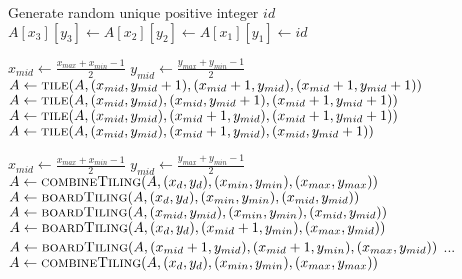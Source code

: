 \documentclass{article}
\begin{document}
\begin{algorithmic}[1]
\State Generate random unique positive integer $id$
\State $A[x_3][y_3] \gets A[x_2][y_2] \gets A[x_1][y_1] \gets id$
\State {}
\EndProcedure

\State $x_{mid} \gets \frac{x_{max} + x_{min} - 1}{2}$
\State $y_{mid} \gets \frac{y_{max} + y_{min} - 1}{2}$
\State $A \gets \Call{tile}{A, (x_{mid}, y_{mid} + 1), (x_{mid} + 1, y_{mid}), (x_{mid} + 1, y_{mid} + 1)}$
\State $A \gets \Call{tile}{A, (x_{mid}, y_{mid}), (x_{mid}, y_{mid} + 1), (x_{mid} + 1, y_{mid} + 1)}$
\State $A \gets \Call{tile}{A, (x_{mid}, y_{mid}), (x_{mid} + 1, y_{mid}), (x_{mid} + 1, y_{mid} + 1)}$
\Else
\State $A \gets \Call{tile}{A, (x_{mid}, y_{mid}), (x_{mid} + 1, y_{mid}), (x_{mid}, y_{mid} + 1)}$
\EndIf
\State {}
\EndProcedure

\State $x_{mid} \gets \frac{x_{max} + x_{min} - 1}{2}$
\State $y_{mid} \gets \frac{y_{max} + y_{min} - 1}{2}$
 
\State $A \gets \Call{combineTiling}{A, (x_d, y_d), (x_{min}, y_{min}), (x_{max}, y_{max})}$
\State {}
\EndIf
{} 
\State $A \gets \Call{boardTiling}{A, (x_d, y_d), (x_{min}, y_{min}), (x_{mid}, y_{mid})}$
\Else
\State $A \gets \Call{boardTiling}{A, (x_{mid}, y_{mid}), (x_{min}, y_{min}), (x_{mid}, y_{mid})}$
\EndIf
{} 
\State $A \gets \Call{boardTiling}{A, (x_d, y_d), (x_{mid} + 1, y_{min}), (x_{max}, y_{mid})}$
\Else
\State $A \gets \Call{boardTiling}{A, (x_{mid} + 1, y_{mid}), (x_{mid} + 1, y_{min}), (x_{max}, y_{mid})}$
\EndIf
\State ...
\State $A \gets \Call{combineTiling}{A, (x_d, y_d), (x_{min}, y_{min}), (x_{max}, y_{max})}$
\State {}
\EndProcedure
\State {}
\end{algorithmic}
\end{document}
